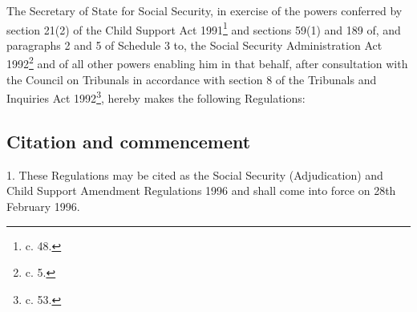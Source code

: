 \documentclass[12pt,a4paper]{article}
\title{\regstitle}
\author{S.I. 1996 No. 182}
\date{Made 31st January 1996\\Laid before Parliament 7th February 1996\\Coming into force 28th February 1996}
\begin{document}
\maketitle

\noindent
The Secretary of State for Social Security, in exercise of the powers conferred by section 21(2) of the Child Support Act 1991\footnote{ c. 48.} and sections 59(1) and 189 of, and paragraphs 2 and 5 of Schedule 3 to, the Social Security Administration Act 1992\footnote{ c. 5.} and of all other powers enabling him in that behalf, after consultation with the Council on Tribunals in accordance with section 8 of the Tribunals and Inquiries Act 1992\footnote{ c. 53.}, hereby makes the following Regulations:

{\sloppy

\tableofcontents

}

\setcounter{secnumdepth}{-2}

\subsection[1. Citation and commencement]{Citation and commencement}

1.  These Regulations may be cited as the Social Security (Adjudication) and Child Support Amendment Regulations 1996 and shall come into force on 28th February 1996.

\end{document}
